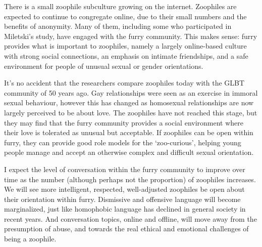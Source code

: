 There is a small zoophile subculture growing on the internet. Zoophiles are expected to continue to congregate online, due to their small numbers and the benefits of anonymity. Many of them, including some who participated in Miletski's study, have engaged with the furry community. This makes sense: furry provides what is important to zoophiles, namely a largely online-based culture with strong social connections, an emphasis on intimate friendships, and a safe environment for people of unusual sexual or gender orientations.

It's no accident that the researchers compare zoophiles today with the GLBT community of 50 years ago. Gay relationships were seen as an exercise in immoral sexual behaviour, however this has changed as homosexual relationships are now largely perceived to be about love. The zoophiles have not reached this stage, but they may find that the furry community provides a social environment where their love is tolerated as unusual but acceptable. If zoophiles can be open within furry, they can provide good role models for the `zoo-curious', helping young people manage and accept an otherwise complex and difficult sexual orientation.

I expect the level of conversation within the furry community to improve over time as the number (although perhaps not the proportion) of zoophiles increases. We will see more intelligent, respected, well-adjusted zoophiles be open about their orientation within furry. Dismissive and offensive language will become marginalized, just like homophobic language has declined in general society in recent years. And conversation topics, online and offline, will move away from the presumption of abuse, and towards the real ethical and emotional challenges of being a zoophile.
